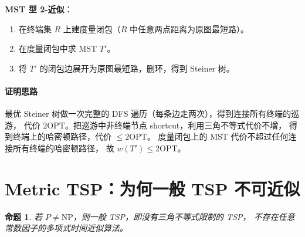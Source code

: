 \documentclass[UTF8,openany,12pt]{ctexbook}
\newtheorem{proposition}{命题}[chapter]
\theoremstyle{remark}
\newcommand{\proofidea}[1]{\paragraph{证明思路}#1}
\newcommand{\OPT}{\mathrm{OPT}}
\newcommand{\NP}{\mathrm{NP}}
\begin{document}
\textbf{MST 型 2-近似}：

\begin{enumerate}
  \item 在终端集 $R$ 上建度量闭包（$R$ 中任意两点距离为原图最短路）。
  \item 在度量闭包中求 MST $T'$。
  \item 将 $T'$ 的闭包边展开为原图最短路，删环，得到 Steiner 树。
\end{enumerate}

\proofidea{
最优 Steiner 树做一次完整的 DFS 遍历（每条边走两次），得到连接所有终端的巡游，
代价 $2\OPT$。把巡游中非终端节点 shortcut，利用三角不等式代价不增，
得到终端上的哈密顿路径，代价 $\le 2\OPT$。
度量闭包上的 MST 代价不超过任何连接所有终端的哈密顿路径，
故 $w(T') \le 2\OPT$。
}

\section{Metric TSP：为何一般 TSP 不可近似}

\begin{proposition}
若 $P \ne \NP$，则一般 TSP，即没有三角不等式限制的 TSP，
不存在任意常数因子的多项式时间近似算法。
\end{proposition}
\end{document}
